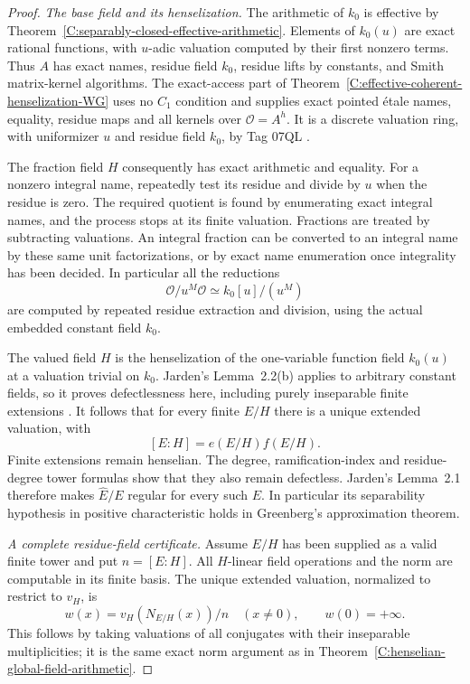 \begin{proof}
\emph{The base field and its henselization.}
The arithmetic of $k_0$ is effective
by Theorem~\ref{C:separably-closed-effective-arithmetic}.
Elements of $k_0(u)$ are exact rational
functions, with $u$-adic valuation
computed by their first nonzero terms.
Thus $A$ has exact names, residue
field $k_0$, residue lifts by constants,
and Smith matrix-kernel algorithms.
The exact-access part of
Theorem~\ref{C:effective-coherent-henselization-WG}
uses no $C_1$ condition and supplies
exact pointed \'{e}tale names, equality,
residue maps and all kernels over
$\mathcal O=A^h$.
It is a discrete valuation ring,
with uniformizer $u$ and residue
field $k_0$, by Tag 07QL
\cite[Lemmas 15.46.1 and 15.46.11]
{C-StacksCoherentHenselizations}.

The fraction field $H$ consequently
has exact arithmetic and equality.
For a nonzero integral name, repeatedly
test its residue and divide by $u$
when the residue is zero.
The required quotient is found by
enumerating exact integral names,
and the process stops at its finite
valuation.  Fractions are treated
by subtracting valuations.
An integral fraction can be converted
to an integral name by these same
unit factorizations, or by exact
name enumeration once integrality
has been decided.
In particular all the reductions
\[
       \mathcal O/u^M\mathcal O
                  \simeq k_0[u]/(u^M)                \tag{C.3.IR2}
\]
are computed by repeated residue
extraction and division, using the
actual embedded constant field $k_0$.

The valued field $H$ is the
henselization of the one-variable
function field $k_0(u)$ at a
valuation trivial on $k_0$.
Jarden's Lemma~2.2(b) applies to
arbitrary constant fields, so it
proves defectlessness here, including
purely inseparable finite extensions
\cite[Lemmas 2.1--2.2]{C-JardenHenselian1994}.
It follows that for every finite
$E/H$ there is a unique extended
valuation, with
\[
 [E:H]=e(E/H)f(E/H).                                    \tag{C.3.IR3}
\]
Finite extensions remain henselian.
The degree, ramification-index and
residue-degree tower formulas show
that they also remain defectless.
Jarden's Lemma~2.1 therefore makes
$\widehat E/E$ regular for every
such $E$.  In particular its
separability hypothesis in positive
characteristic holds in Greenberg's
approximation theorem.

\emph{A complete residue-field certificate.}
Assume $E/H$ has been supplied as
a valid finite tower and put $n=[E:H]$.
All $H$-linear field operations and
the norm are computable in its
finite basis.
The unique extended valuation,
normalized to restrict to $v_H$,
is
\[
        w(x)=v_H(N_{E/H}(x))/n\quad(x\ne0),
                  \qquad w(0)=+\infty .               \tag{C.3.IR4}
\]
This follows by taking valuations
of all conjugates with their
inseparable multiplicities; it
is the same exact norm argument
as in
Theorem~\ref{C:henselian-global-field-arithmetic}.


\end{proof}
